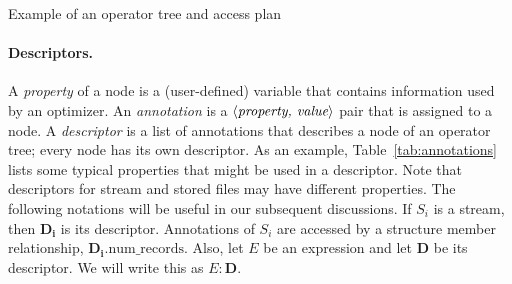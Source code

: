 \begin{centeredfigure}
\setlength{\unitlength}{0.6in}
%
\myshadowbox
{
%
\vrule
%
}
%
\caption{Example of an operator tree and access plan}
\label{fig:expexample}
\end{centeredfigure}

\paragraph{Descriptors.}
A \emph{property} of a node is a (user-defined) variable that contains
information used by an optimizer.  An \emph{annotation} is a $\langle
\emph{property, value} \rangle$ pair that is assigned to a node.  A
\emph{descriptor} is a list of annotations that describes a node of an
operator tree; every node has its own descriptor.  As an example,
Table~\ref{tab:annotations} lists some typical properties that might be
used in a descriptor.  Note that descriptors for stream and stored
files may have different properties.  The following notations will be
useful in our subsequent discussions.  If $S_i$ is a stream, then
$\mathbf{D_i}$ is its descriptor.  Annotations of $S_i$ are accessed by
a structure member relationship, \eg
$\mathbf{D_i}.\text{num\_records}$.  Also, let $E$ be an expression and
let $\mathbf{D}$ be its descriptor.  We will write this as
$E:\mathbf{D}$.

